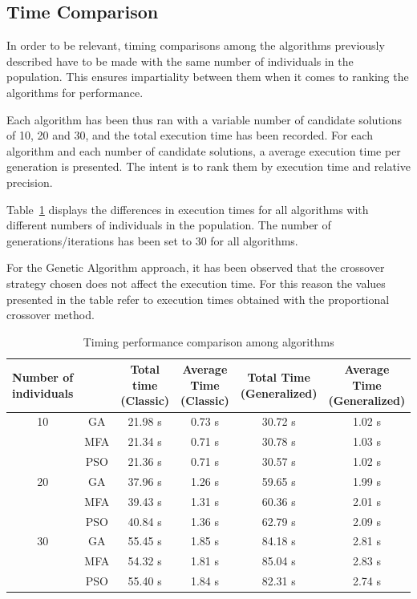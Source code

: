 \subsection{Time Comparison}
\label{sec:5.comparison_time}

In order to be relevant, timing comparisons among the algorithms previously described
have to be made with the same number of individuals in the population.
This ensures impartiality between them when it comes to ranking the algorithms
for performance.

Each algorithm has been thus ran with a variable number of candidate solutions of
10, 20 and 30, and the total execution time has been recorded.
For each algorithm and each number of candidate solutions,
a average execution time per generation is presented. The intent
is to rank them by execution time and relative precision.

Table~\ref{tab:timing} displays the differences in execution times
for all algorithms with different numbers of individuals in the population.
The number of generations/iterations has been set to 30 for all algorithms.

For the Genetic Algorithm approach, it has been observed that the crossover
strategy chosen does not affect the execution time. For this reason
the values presented in the table refer to execution times obtained
with the proportional crossover method.

\begin{table}[H]
	\centering
	\begin{tabular}{c c c c c c}
		\toprule
		\thead{ Number of \\ individuals}	&	\thead{ Algorithm}	&	\thead{ Total time \\ (Classic)}	& \thead{ Average Time \\ (Classic)}	& \thead{ Total Time \\ (Generalized)} &	\thead{ Average Time \\ (Generalized)}	\\
		\midrule
		10 	& GA	& 21.98 s	& 0.73 s	& 30.72 s	& 1.02 s	\\
			& MFA	& 21.34 s	& 0.71 s	& 30.78 s	& 1.03 s	\\
			& PSO	& 21.36 s	& 0.71 s	& 30.57 s	& 1.02 s	\\ \midrule
		20	& GA	& 37.96 s	& 1.26 s	& 59.65 s	& 1.99 s	\\
			& MFA	& 39.43 s	& 1.31 s	& 60.36 s	& 2.01 s	\\
			& PSO	& 40.84 s	& 1.36 s	& 62.79 s	& 2.09 s	\\ \midrule
		30	& GA	& 55.45 s	& 1.85 s	& 84.18 s	& 2.81 s	\\
			& MFA	& 54.32 s	& 1.81 s	& 85.04 s	& 2.83 s	\\
			& PSO	& 55.40 s	& 1.84 s	& 82.31 s	& 2.74 s	\\ \bottomrule
	\end{tabular}
\caption{Timing performance comparison among algorithms}
\label{tab:timing}
\end{table}

